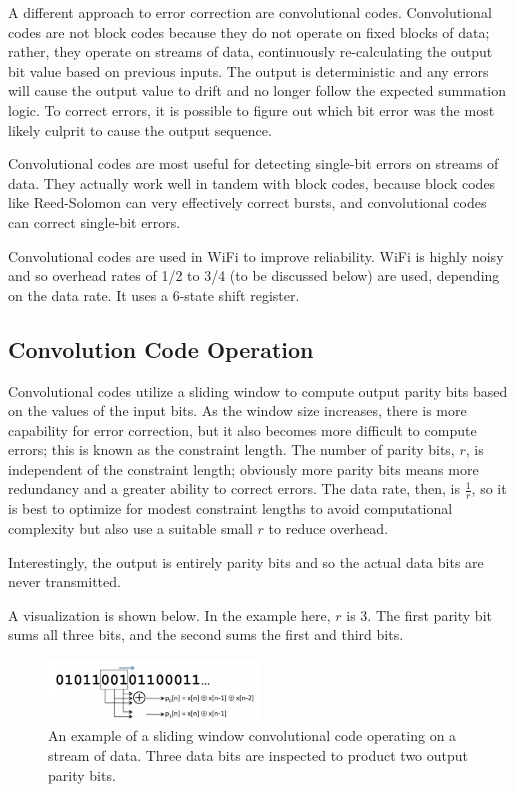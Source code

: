 \documentclass[12pt]{article}
\begin{document}
A different approach to error correction are convolutional codes. Convolutional codes are not block codes because they do not operate on fixed blocks of data; rather, they operate on streams of data, continuously re-calculating the output bit value based on previous inputs. The output is deterministic and any errors will cause the output value to drift and no longer follow the expected summation logic. To correct errors, it is possible to figure out which bit error was the most likely culprit to cause the output sequence.

Convolutional codes are most useful for detecting single-bit errors on streams of data. They actually work well in tandem with block codes, because block codes like Reed-Solomon can very effectively correct bursts, and convolutional codes can correct single-bit errors.  \cite{tanenbaum}

Convolutional codes are used in WiFi to improve reliability. WiFi is highly noisy and so overhead rates of 1/2 to 3/4 (to be discussed below) are used, depending on the data rate. It uses a 6-state shift register. \cite{wlan} 


\subsection{Convolution Code Operation}

Convolutional codes utilize a sliding window to compute output parity bits based on the values of the input bits. As the window size increases, there is more capability for error correction, but it also becomes more difficult to compute errors; this is known as the constraint length. The number of parity bits, $r$, is independent of the constraint length; obviously more parity bits means more redundancy and a greater ability to correct errors. The data rate, then, is $\frac{1}{r}$, so it is best to optimize for modest constraint lengths to avoid computational complexity but also use a suitable small $r$ to reduce overhead. 

Interestingly, the output is entirely parity bits and so the actual data bits are never transmitted. 

A visualization is shown below. In the example here, $r$ is 3. The first parity bit sums all three bits, and the second sums the first and third bits.

\begin{figure}[h!]
 \centering
 \includegraphics[width=0.5\textwidth]{img/conv.png}
 \caption{An example of a sliding window convolutional code operating on a stream of data. Three data bits are inspected to product two output parity bits. \cite{mitconv}} 
 \label{fig:conv}
 \end{figure}
\end{document}
